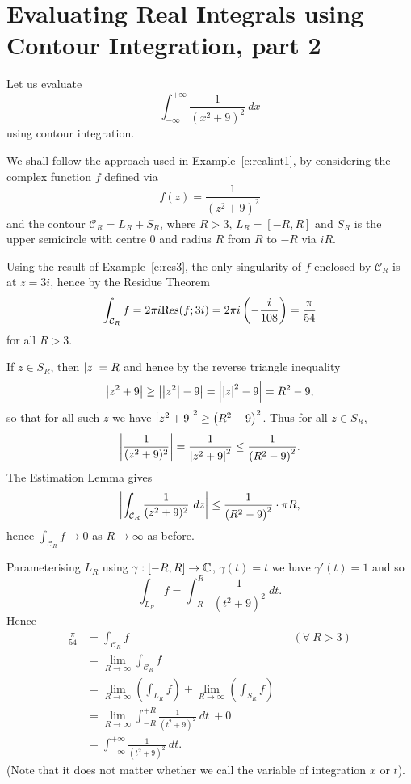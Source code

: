 \section{Evaluating Real Integrals using Contour Integration, part 2}
\begin{example}
Let us evaluate
\[
\int_{-\infty}^{+\infty} \frac{1}{(x^2+9)^2}\ dx
\]
using contour integration.

We shall follow the approach used in Example~\ref{e:realint1}, by considering the complex function $f$ defined via
\[
f(z) = \frac{1}{(z^2+9)^2}
\]
and the contour $\mathcal{C}_R=L_R+S_R$, where $R>3$, $L_R=[-R,R]$ and $S_R$ is the upper semicircle with centre $0$ and radius $R$ from $R$ to $-R$ via $iR$.

Using the result of Example~\ref{e:res3}, the only singularity of $f$ enclosed by $\mathcal{C}_R$ is at $z=3i$, hence by the Residue Theorem
\[
\int_{\mathcal{C}_R} f = 2\pi i \mathrm{Res} (f;3i) = 2\pi i \left( -\frac{i}{108} \right) = \frac{\pi}{54}
\]
for all $R>3$.

If $z \in S_R$, then $\left| z \right|=R$ and hence by the reverse triangle inequality
\[
\left| z^2+9 \right| \geq \left| \left| z^2 \right|-9 \right| = \left| \left| z \right|^2-9 \right| = R^2-9,
\]
so that for all such $z$ we have $\left| z^2+9 \right|^2 \geq \left( R^2-9 \right)^2$.  Thus for all $z \in S_R$,
\[
\left| \frac{1}{(z^2+9)^2} \right| = \frac{1}{\left| z^2+9 \right|^2} \leq \frac{1}{\left(R^2-9 \right)^2}.
\]
The Estimation Lemma gives
\[
\left|  \int_{\mathcal{C}_R} \frac{1}{(z^2+9)^2}\ dz  \right| \leq \frac{1}{\left(R^2-9 \right)^2} \cdot \pi R,
\]
hence $\displaystyle \int_{\mathcal{C}_R} f \to 0$ as $R \to \infty$ as before.

Parameterising $L_R$ using $\gamma:[-R,R] \to \mathbb{C}$, $\gamma(t)=t$ we have $\gamma'(t)=1$ and so
\[
\int_{L_R} f = \int_{-R}^{R} \frac{1}{(t^2+9)^2}\ dt.
\]
Hence
\begin{align*}
\frac{\pi}{54} & = \int_{\mathcal{C}_R} f  && (\forall\ R>3) \\
& = \lim_{R \to \infty} \int_{\mathcal{C}_R} f && \\
& = \lim_{R \to \infty} \left( \int_{L_R} f \right) + \lim_{R \to \infty} \left( \int_{S_R} f \right) && \\
& = \lim_{R \to \infty} \int_{-R}^{+R} \frac{1}{(t^2+9)^2}\ dt\ +0&& \\
 &= \int_{-\infty}^{+\infty} \frac{1}{(t^2+9)^2}\ dt. &&
\end{align*}
(Note that it does not matter whether we call the variable of integration $x$ or $t$).
\end{example}

